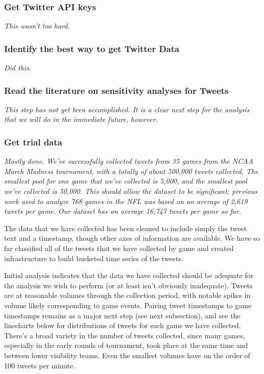 \documentclass[12pt]{article}
\begin{document}
\subsubsection*{Get Twitter API keys}

\textit{This wasn't too hard.}

\subsubsection*{Identify the best way to get Twitter Data}

\textit{Did this.}

\subsubsection*{Read the literature on sensitivity analyses for Tweets}

\textit{This step has not yet been accomplished. It is a clear next step for the analysis that we will do in the immediate future, however.}

\subsubsection*{Get trial data}

\textit{Mostly done. We've successfully collected tweets
from 35 games from the NCAA March Madness
tournament, with a totally of about 500,000 tweets collected. The smallest pool for
one game that we've collected is 5,000,
and the smallest pool we've collected
is 50,000. This should allow
the dataset to be significant: previous
work used to analyze 768 games
in the NFL was based on an average of 
2,619 tweets per game. Our dataset has
on average 16,747 tweets per game so far. }

The data that we have collected has been
cleaned to include simply the tweet text
and a timestamp, though other axes of
information are available. We have so
far classified all of the tweets that
we have collected by game and created
infrastructure to build bucketed
time series of the tweets.

Initial analysis indicates that the data
we have collected should be adequate 
for the analysis we wish to perform 
(or at least isn't obviously inadequate).
Tweets are at reasonable volumes
through the collection period, with
notable spikes in volume likely
corresponding to game events. 
Pairing tweet timestamps to game timestamps
remains as a major next step (see next subsection), and see the linecharts below
for distributions of tweets for each game
we have collected. There's a broad
variety in the number of tweets collected,
since many games, especially in the early
rounds of tournament, took place at
the same time and between lower
visibility teams. Even the smallest
volumes have on the order of 100 tweets per minute.
\end{document}
